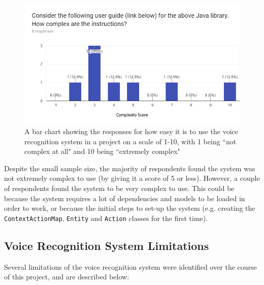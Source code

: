 \documentclass[11pt]{article}
\begin{document}
\begin{figure}[H]
\begin{center}
  \includegraphics[width=\linewidth]{survey-ease}
  \caption{A bar chart showing the responses for how easy it is to use the voice recognition system in a project on a scale of 1-10, with 1 being ``not complex at all" and 10 being ``extremely complex"}
  \label{fig:survey-ease}
  \end{center}
\end{figure}

Despite the small sample size, the majority of respondents found the system was not extremely complex to use (by giving it a score of 5 or less). However, a couple of respondents found the system to be very complex to use. This could be because the system requires a lot of dependencies and models to be loaded in order to work, or because the initial steps to set-up the system (e.g. creating the \texttt{ContextActionMap}, \texttt{Entity} and \texttt{Action} classes for the first time).

\subsection{Voice Recognition System Limitations}

Several limitations of the voice recognition system were identified over the course of this project, and are described below:
\end{document}
